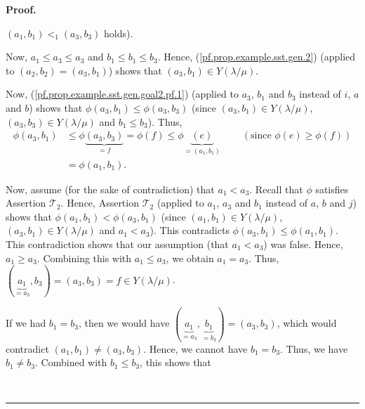 \documentclass[numbers=enddot,12pt,final,onecolumn,notitlepage,abstracton]{scrartcl}
\theoremstyle{definition}
\newenvironment{proof}[1][Proof]{\noindent\textbf{#1.} }{\ \rule{0.5em}{0.5em}}
\newenvironment{verlong}{}{}
\begin{document}
\begin{verlong}
\begin{footnotesize}
\begin{proof}
{$\left(  a_{1},b_{1}\right)  <_{1}\left(  a_{3},b_{3}\right)  $ holds).
\par
Now, $a_{1}\leq a_{3}\leq a_{3}$ and $b_{1}\leq b_{1}\leq b_{3}$. Hence,
(\ref{pf.prop.example.sst.gen.2}) (applied to $\left(  a_{2},b_{2}\right)
=\left(  a_{3},b_{1}\right)  $) shows that $\left(  a_{3},b_{1}\right)  \in
Y\left(  \lambda/\mu\right)  $.
\par
Now, (\ref{pf.prop.example.sst.gen.goal2.pf.1}) (applied to $a_{3}$, $b_{1}$
and $b_{3}$ instead of $i$, $a$ and $b$) shows that $\phi\left(  a_{3}%
,b_{1}\right)  \leq\phi\left(  a_{3},b_{3}\right)  $ (since $\left(
a_{3},b_{1}\right)  \in Y\left(  \lambda/\mu\right)  $, $\left(  a_{3}%
,b_{3}\right)  \in Y\left(  \lambda/\mu\right)  $ and $b_{1}\leq b_{3}$).
Thus,
\begin{align*}
\phi\left(  a_{3},b_{1}\right)   &  \leq\phi\underbrace{\left(  a_{3}%
,b_{3}\right)  }_{=f}=\phi\left(  f\right)  \leq\phi\underbrace{\left(
e\right)  }_{=\left(  a_{1},b_{1}\right)  }\ \ \ \ \ \ \ \ \ \ \left(
\text{since }\phi\left(  e\right)  \geq\phi\left(  f\right)  \right) \\
&  =\phi\left(  a_{1},b_{1}\right)  .
\end{align*}
\par
Now, assume (for the sake of contradiction) that $a_{1}<a_{3}$. Recall that
$\phi$ satisfies Assertion $\mathcal{T}_{2}$. Hence, Assertion $\mathcal{T}%
_{2}$ (applied to $a_{1}$, $a_{3}$ and $b_{1}$ instead of $a$, $b$ and $j$)
shows that $\phi\left(  a_{1},b_{1}\right)  <\phi\left(  a_{3},b_{1}\right)  $
(since $\left(  a_{1},b_{1}\right)  \in Y\left(  \lambda/\mu\right)  $,
$\left(  a_{3},b_{1}\right)  \in Y\left(  \lambda/\mu\right)  $ and
$a_{1}<a_{3}$). This contradicts $\phi\left(  a_{3},b_{1}\right)  \leq
\phi\left(  a_{1},b_{1}\right)  $. This contradiction shows that our
assumption (that $a_{1}<a_{3}$) was false. Hence, $a_{1}\geq a_{3}$. Combining
this with $a_{1}\leq a_{3}$, we obtain $a_{1}=a_{3}$. Thus, $\left(
\underbrace{a_{1}}_{=a_{3}},b_{3}\right)  =\left(  a_{3},b_{3}\right)  =f\in
Y\left(  \lambda/\mu\right)  $.
\par
If we had $b_{1}=b_{3}$, then we would have $\left(  \underbrace{a_{1}%
}_{=a_{3}},\underbrace{b_{1}}_{=b_{3}}\right)  =\left(  a_{3},b_{3}\right)  $,
which would contradict $\left(  a_{1},b_{1}\right)  \neq\left(  a_{3}%
,b_{3}\right)  $. Hence, we cannot have $b_{1}=b_{3}$. Thus, we have
$b_{1}\neq b_{3}$. Combined with $b_{1}\leq b_{3}$, this shows that
}
\end{proof}
\end{footnotesize}
\end{verlong}
\end{document}
